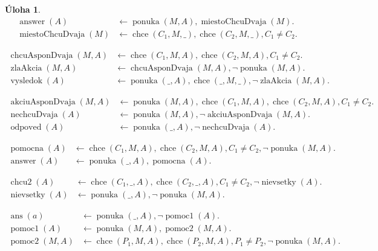 \documentclass[10pt, a4paper]{article}
\theoremstyle{definition}
\newtheorem{problem}{Úloha}[section]
\DeclareMathOperator{\ponuka}{ponuka}
\DeclareMathOperator{\chce}{chce}
\DeclareMathOperator{\answer}{answer}
\begin{document}
\begin{problem}
\begin{align*}
\answer(A)& \leftarrow \ponuka(M,A), \operatorname{miestoChcuDvaja}(M).\\
\operatorname{miestoChcuDvaja}(M)& \leftarrow \chce(C_1,M,\_), \chce(C_2,M,\_), C_1\neq C_2.
\end{align*}

\begin{align*}
\operatorname{chcuAsponDvaja}(M, A) & \leftarrow \chce(C_1, M, A), \chce(C_2, M, A), C_1 \neq C_2.\\
\operatorname{zlaAkcia}(M, A) & \leftarrow \operatorname{chcuAsponDvaja}(M, A), \neg \ponuka(M, A).\\
\operatorname{vysledok}(A) & \leftarrow \ponuka(\_, A), \chce(\_, M, \_), \neg \operatorname{zlaAkcia}(M, A).
\end{align*}

\begin{align*}
\operatorname{akciuAsponDvaja}(M, A) & \leftarrow \ponuka(M, A), \chce(C_1, M, A), \chce(C_2, M, A), C_1\neq C_2.\\
\operatorname{nechcuDvaja}(A) & \leftarrow \ponuka(M, A), \neg \operatorname{akciuAsponDvaja}(M, A).\\
\operatorname{odpoved}(A) & \leftarrow \ponuka(\_, A), \neg \operatorname{nechcuDvaja}(A).
\end{align*}

\begin{align*}
\operatorname{pomocna}(A) & \leftarrow \chce(C_1, M, A), \chce(C_2, M, A), C_1\neq C_2, \neg \ponuka(M, A).\\
\operatorname{answer}(A) & \leftarrow \ponuka(\_, A), \operatorname{pomocna}(A).
\end{align*}

\begin{align*}
\operatorname{chcu2}(A)& \leftarrow \chce(C_1,\_,A), \chce(C_2,\_,A), C_1\neq C_2, \neg \operatorname{nievsetky}(A).\\
\operatorname{nievsetky}(A)& \leftarrow \ponuka(\_,A), \neg \ponuka(M,A).
\end{align*}

\begin{align*}
\operatorname{ans}(a) & \leftarrow \ponuka(\_, A), \neg \operatorname{pomoc1}(A).\\
\operatorname{pomoc1}(A) & \leftarrow \ponuka(M,A), \operatorname{pomoc2}(M,A).\\
\operatorname{pomoc2}(M,A) & \leftarrow \chce(P_1, M, A), \chce(P_2, M, A), P_1 \neq P_2, \neg \ponuka(M, A).
\end{align*}


\end{problem}
\end{document}
